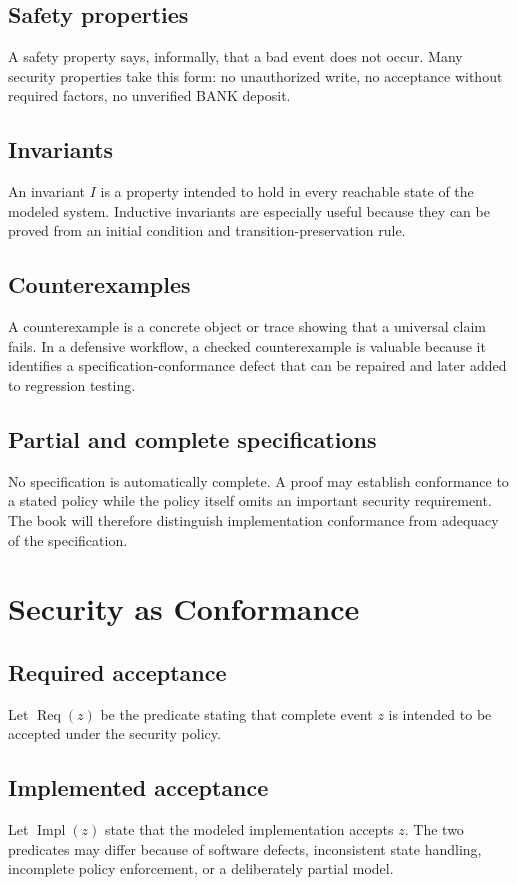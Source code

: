 \documentclass[11pt,oneside]{book}
\theoremstyle{definition}
\theoremstyle{remark}
\newcommand{\Impl}{\operatorname{Impl}}
\newcommand{\Req}{\operatorname{Req}}
\begin{document}
\section{Safety properties}
A safety property says, informally, that a bad event does not occur. Many security properties take this form: no unauthorized write, no acceptance without required factors, no unverified BANK deposit.

\section{Invariants}
An invariant $I$ is a property intended to hold in every reachable state of the modeled system. Inductive invariants are especially useful because they can be proved from an initial condition and transition-preservation rule.

\section{Counterexamples}
A counterexample is a concrete object or trace showing that a universal claim fails. In a defensive workflow, a checked counterexample is valuable because it identifies a specification-conformance defect that can be repaired and later added to regression testing.

\section{Partial and complete specifications}
No specification is automatically complete. A proof may establish conformance to a stated policy while the policy itself omits an important security requirement. The book will therefore distinguish implementation conformance from adequacy of the specification.

\chapter{Security as Conformance}
\label{ch:conformance}
\section{Required acceptance}
Let $\Req(z)$ be the predicate stating that complete event $z$ is intended to be accepted under the security policy.

\section{Implemented acceptance}
Let $\Impl(z)$ state that the modeled implementation accepts $z$. The two predicates may differ because of software defects, inconsistent state handling, incomplete policy enforcement, or a deliberately partial model.
\end{document}
